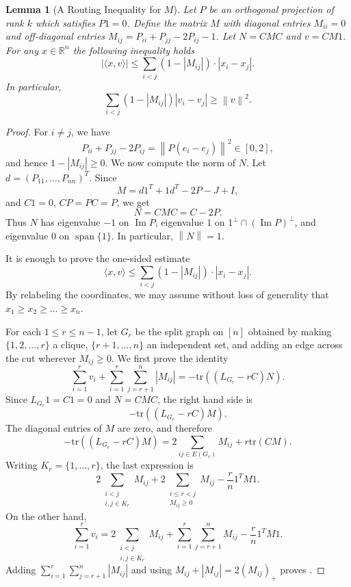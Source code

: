 \documentclass[10pt,reqno]{amsart}
\newtheorem{lemma}[theorem]{Lemma}
\theoremstyle{definition}
\theoremstyle{remark}
\numberwithin{equation}{section}
\newcommand{\R}{\mathbb{R}}
\newcommand{\tr}{\text{tr} }
\newcommand{\norm}[1]{\left\| #1 \right\|}
\begin{document}
\begin{lemma}[A Routing Inequality for $M$]\label{lem:final}
Let $P$ be an orthogonal projection of rank $k$ which satisfies $P1=0$. Define the matrix $M$ with diagonal entries $M_{ii}=0$ and off-diagonal entries $M_{ij}=P_{ii}+P_{jj}-2P_{ij}-1$. Let $N=CMC$ and $v=CM1$.
For any $x\in \R^n$ the following inequality holds
$$|\langle x,v\rangle |\le \sum\limits_{i<j}(1-|M_{ij}|)\cdot |x_i-x_j|.$$
In particular,
$$ \sum\limits_{i<j}(1-|M_{ij}|)|v_i-v_j|\ge \norm{v}^2.$$
\end{lemma}





\begin{proof}
    For $i\ne j$, we have
    \[
        P_{ii}+P_{jj}-2P_{ij}=\norm{P(e_i-e_j)}^2\in [0,2],
    \]
    and hence $1-|M_{ij}|\ge 0$.
    We now compute the norm of $N$. Let $d=(P_{11},\ldots,P_{nn})^T$. Since
    \[
        M=d1^T+1d^T-2P-J+I,
    \]
    and $C1=0$, $CP=PC=P$, we get
    \[
        N=CMC=C-2P.
    \]
    Thus $N$ has eigenvalue $-1$ on $\operatorname{Im}P$, eigenvalue $1$ on
    $1^\perp\cap(\operatorname{Im}P)^\perp$, and eigenvalue $0$ on
    $\operatorname{span}\{1\}$. In particular, $\norm{N}=1$.

    It is enough to prove the one-sided estimate 
    $$\langle x,v\rangle \le \sum\limits_{i<j}(1-|M_{ij}|)\cdot |x_i-x_j|.$$
    By relabeling the coordinates, we may assume without loss of generality that $x_1\ge x_2\ge \ldots \ge x_n$.

    For each $1\le r\le n-1$, let $G_r$ be the split graph on $[n]$ obtained by making $\{1,2,\ldots,r\}$ a clique, $\{r+1,\ldots, n\}$ an independent set, and adding an edge across the cut wherever $M_{ij}\ge 0$. We first prove the identity
    \begin{equation}\label{eq:prefixtraceidentity}
    \sum\limits_{i=1}^{r}v_i+\sum\limits_{i=1}^{r}\sum\limits_{j=r+1}^{n} |M_{ij}|=-\tr\left ((L_{G_r}-rC)N\right ).
    \end{equation}
    Since $L_{G_r}1=C1=0$ and $N=CMC$, the right hand side is
    \[
        -\tr\left ((L_{G_r}-rC)M\right ).
    \]
    The diagonal entries of $M$ are zero, and therefore
    \[
        -\tr\left ((L_{G_r}-rC)M\right )
        =
        2\sum\limits_{ij\in E(G_r)}M_{ij}+r\tr(CM).
    \]
    Writing $K_r=\{1,\ldots,r\}$, the last expression is
    \[
        2\sum\limits_{\substack{i<j\\ i,j\in K_r}}M_{ij}
        +2\sum\limits_{\substack{i\le r<j\\ M_{ij}\ge 0}}M_{ij}
        -\dfrac{r}{n}1^TM1.
    \]
    On the other hand,
    \[
        \sum\limits_{i=1}^{r}v_i
        =
        2\sum\limits_{\substack{i<j\\ i,j\in K_r}}M_{ij}
        +\sum\limits_{i=1}^{r}\sum\limits_{j=r+1}^{n}M_{ij}
        -\dfrac{r}{n}1^TM1.
    \]
    Adding $\sum_{i=1}^{r}\sum_{j=r+1}^{n}|M_{ij}|$ and using
    $M_{ij}+|M_{ij}|=2(M_{ij})_+$ proves .


\end{proof}
\end{document}
